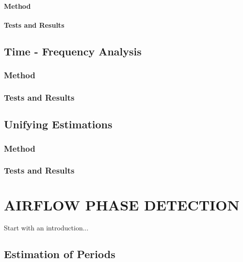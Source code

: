 \documentclass[a4paper,onesided,12pt]{report}
\begin{document}
\subsubsection{Method}
\subsubsection{Tests and Results}


\section{Time - Frequency Analysis}
\subsection{Method}
\subsection{Tests and Results}

\section{Unifying Estimations}
\subsection{Method}
\subsection{Tests and Results}


\chapter{AIRFLOW PHASE DETECTION}
\label{chapter:introduction}
Start with an introduction...

\section{Estimation of Periods}
\end{document}
